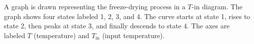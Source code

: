 A graph is drawn representing the freeze-drying process in a \( T \)-\( \text{in} \) diagram. The graph shows four states labeled 1, 2, 3, and 4. The curve starts at state 1, rises to state 2, then peaks at state 3, and finally descends to state 4. The axes are labeled \( T \) (temperature) and \( T_{\text{in}} \) (input temperature).